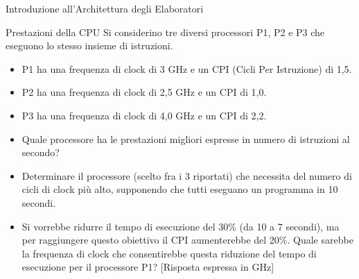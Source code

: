 \documentclass[11pt]{article}
\begin{document}
\begin{quiz}{Introduzione all'Architettura degli Elaboratori}
\begin{cloze}[points=1,shuffle=false]{Prestazioni della CPU}
Si considerino tre diversi processori P1, P2 e P3 che eseguono lo stesso insieme di istruzioni. 
\begin{itemize}
    \item P1 ha una frequenza di clock di 3 GHz e un CPI (Cicli Per Istruzione) di 1,5.
    \item P2 ha una frequenza di clock di 2,5 GHz e un CPI di 1,0.
    \item P3 ha una frequenza di clock di 4,0 GHz e un CPI di 2,2.
\end{itemize}
%    
\begin{itemize}
    \item Quale processore ha le prestazioni migliori espresse in numero di istruzioni al secondo? 
    \item Determinare il processore (scelto fra i 3 riportati) che necessita del numero di cicli di clock più alto, supponendo che tutti eseguano un programma in 10 secondi.
    \item Si vorrebbe ridurre il tempo di esecuzione del 30\% (da 10 a 7 secondi), ma per raggiungere questo obiettivo il CPI aumenterebbe del 20\%. Quale sarebbe la frequenza di clock che consentirebbe questa riduzione del tempo di esecuzione per il processore P1? 
    [Risposta espressa in GHz]
\end{itemize}
\end{cloze}


\end{quiz}
\end{document}
